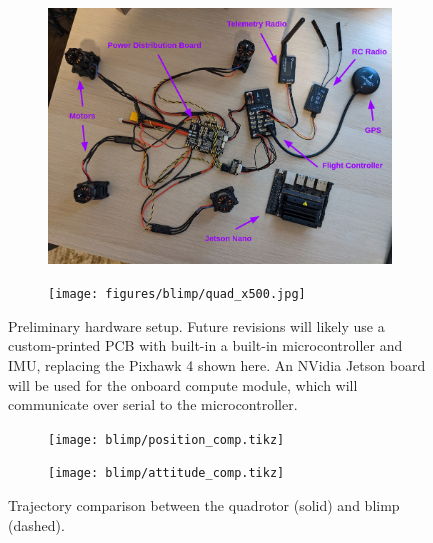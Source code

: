 \documentclass[../root.tex]{subfiles}
\begin{document}
\begin{figure}
    \centering
    \begin{subfigure}[b]{0.48\textwidth}
        \includegraphics[width=\textwidth]{figures/blimp/quad_hardware_v1.png}
    \end{subfigure}
    \hfill
    \begin{subfigure}[b]{0.48\textwidth}
        \texttt{[image: figures/blimp/quad\_x500.jpg]}
    \end{subfigure}
    \caption{Preliminary hardware setup. Future revisions will likely 
    use a custom-printed PCB with built-in a built-in microcontroller
    and IMU, replacing the Pixhawk 4 shown here. An NVidia Jetson board
    will be used for the onboard compute module, which will communicate
    over serial to the microcontroller.}
\end{figure}

\begin{figure}
    \centering
    \begin{subfigure}[b]{0.48\textwidth}
        \texttt{[image: blimp/position\_comp.tikz]}
    \end{subfigure}
    \hfill
    \begin{subfigure}[b]{0.48\textwidth}
        \texttt{[image: blimp/attitude\_comp.tikz]}
    \end{subfigure}
    \caption{Trajectory comparison between the quadrotor (solid) and 
    blimp (dashed).}
    \label{fig:quadblimp_comp}
\end{figure}
\end{document}
